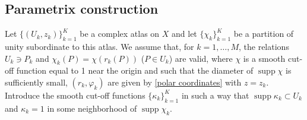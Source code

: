 \documentclass[pdftex]{sigma}
\numberwithin{equation}{section}
\theoremstyle{definition}
\begin{document}
\subsection{Parametrix construction}
\label{parametrix ssec}
Let $\{(U_k,z_k)\}_{k=1}^K$ be a complex atlas on $X$ and let $\{\chi_k\}_{k=1}^K$ be a partition of unity subordinate to this atlas. We assume that, for $k=1,\dots,M$, the relations $U_k\ni P_k$ and $\chi_k(P)=\chi(r_k(P))$ ($P\in U_k$) are valid, where $\chi$ is a smooth cut-off function equal to 1 near the origin and such that the diameter of $\operatorname{supp}\chi$ is sufficiently small, $(r_k,\varphi_k)$ are given by \eqref{polar coordinates} with $z=z_k$. Introduce the smooth cut-off functions $\{\kappa_k\}_{k=1}^K$ in such a way that $\operatorname{supp} \kappa_k\subset U_k$ and $\kappa_k=1$ in some neighborhood of $\operatorname{supp}\chi_k$.
\end{document}
